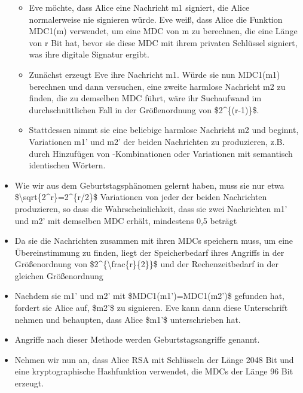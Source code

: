 \documentclass[a4paper]{article}
\begin{document}
\begin{multicols}{3}
\begin{itemize}
              \begin{itemize}
                  \item
                        Eve möchte, dass Alice eine Nachricht m1 signiert, die Alice
                        normalerweise nie signieren würde. Eve weiß, dass Alice die Funktion
                        MDC1(m) verwendet, um eine MDC von m zu berechnen, die eine Länge
                        von r Bit hat, bevor sie diese MDC mit ihrem privaten Schlüssel
                        signiert, was ihre digitale Signatur ergibt.
                  \item
                        Zunächst erzeugt Eve ihre Nachricht m1. Würde sie nun MDC1(m1)
                        berechnen und dann versuchen, eine zweite harmlose Nachricht m2 zu
                        finden, die zu demselben MDC führt, wäre ihr Suchaufwand im
                        durchschnittlichen Fall in der Größenordnung von \$2\^{}\{(r-1)\}\$.
                  \item
                        Stattdessen nimmt sie eine beliebige harmlose Nachricht m2 und
                        beginnt, Variationen m1' und m2' der beiden Nachrichten zu
                        produzieren, z.B. durch Hinzufügen von -Kombinationen oder
                        Variationen mit semantisch identischen Wörtern.
              \end{itemize}
        \item
              Wie wir aus dem Geburtstagsphänomen gelernt haben, muss sie nur etwa
              \$\textbackslash sqrt\{2\^{}r\}=2\^{}\{r/2\}\$ Variationen von jeder
              der beiden Nachrichten produzieren, so dass die Wahrscheinlichkeit,
              dass sie zwei Nachrichten m1' und m2' mit demselben MDC erhält,
              mindestens 0,5 beträgt
        \item
              Da sie die Nachrichten zusammen mit ihren MDCs speichern muss, um eine
              Übereinstimmung zu finden, liegt der Speicherbedarf ihres Angriffs in
              der Größenordnung von \$2\^{}\{\textbackslash frac\{r\}\{2\}\}\$ und
              der Rechenzeitbedarf in der gleichen Größenordnung
        \item
              Nachdem sie m1' und m2' mit \$MDC1(m1')=MDC1(m2')\$ gefunden hat,
              fordert sie Alice auf, \$m2'\$ zu signieren. Eve kann dann diese
              Unterschrift nehmen und behaupten, dass Alice \$m1'\$ unterschrieben
              hat.
        \item
              Angriffe nach dieser Methode werden Geburtstagsangriffe genannt.
        \item
              Nehmen wir nun an, dass Alice RSA mit Schlüsseln der Länge 2048 Bit
              und eine kryptographische Hashfunktion verwendet, die MDCs der Länge
              96 Bit erzeugt.


\end{itemize}
\end{multicols}
\end{document}
